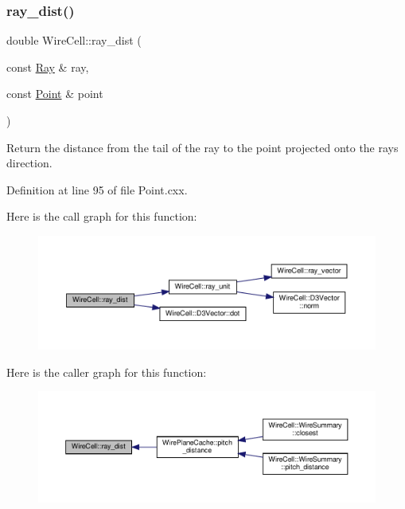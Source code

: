 \subsubsection{\texorpdfstring{ray\+\_\+dist()}{ray\_dist()}}
{\footnotesize\ttfamily double Wire\+Cell\+::ray\+\_\+dist (\begin{DoxyParamCaption}\item[{const \hyperlink{namespace_wire_cell_a3ab20d9b438feb7eb1ffaab9ba98af0c}{Ray} \&}]{ray,  }\item[{const \hyperlink{namespace_wire_cell_ab2b2565fa6432efbb4513c14c988cda9}{Point} \&}]{point }\end{DoxyParamCaption})}

Return the distance from the tail of the ray to the point projected onto the ray\textquotesingle{}s direction. 

Definition at line 95 of file Point.\+cxx.

Here is the call graph for this function\+:
\nopagebreak
\begin{figure}[H]
\begin{center}
\leavevmode
\includegraphics[width=350pt]{namespace_wire_cell_a5ff051f9db5117e68d6a372ce828a90a_cgraph}
\end{center}
\end{figure}
Here is the caller graph for this function\+:
\nopagebreak
\begin{figure}[H]
\begin{center}
\leavevmode
\includegraphics[width=350pt]{namespace_wire_cell_a5ff051f9db5117e68d6a372ce828a90a_icgraph}
\end{center}
\end{figure}
\mbox{\label{namespace_wire_cell_a078ec264f4f9f82fe3e6ba21b2108d00}} 
